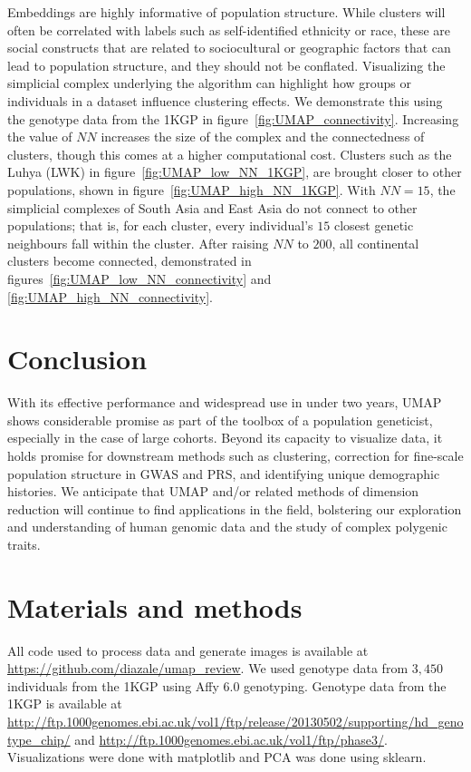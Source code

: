 \documentclass[12pt]{article}
\begin{document}
Embeddings are highly informative of population structure. While clusters will often be correlated with labels such as self-identified ethnicity or race, these are social constructs that are related to sociocultural or geographic factors that can lead to population structure, and they should not be conflated. Visualizing the simplicial complex underlying the algorithm can highlight how groups or individuals in a dataset influence clustering effects. We demonstrate this using the genotype data from the 1KGP in figure~\ref{fig:UMAP_connectivity}. Increasing the value of $NN$ increases the size of the complex and the connectedness of clusters, though this comes at a higher computational cost. Clusters such as the Luhya (LWK) in figure~\ref{fig:UMAP_low_NN_1KGP}, are brought closer to other populations, shown in figure~\ref{fig:UMAP_high_NN_1KGP}. With $NN=15$, the simplicial complexes of South Asia and East Asia do not connect to other populations; that is, for each cluster, every individual's $15$ closest genetic neighbours fall within the cluster. After raising $NN$ to $200$, all continental clusters become connected, demonstrated in figures~\ref{fig:UMAP_low_NN_connectivity} and \ref{fig:UMAP_high_NN_connectivity}.

\section*{Conclusion}
With its effective performance and widespread use in under two years, UMAP shows considerable promise as part of the toolbox of a population geneticist, especially in the case of large cohorts. Beyond its capacity to visualize data, it holds promise for downstream methods such as clustering, correction for fine-scale population structure in GWAS and PRS, and identifying unique demographic histories. We anticipate that UMAP and/or related methods of dimension reduction will continue to find applications in the field, bolstering our exploration and understanding of human genomic data and the study of complex polygenic traits.

\section*{Materials and methods}
All code used to process data and generate images is available at \url{https://github.com/diazale/umap_review}. We used genotype data from $3,450$ individuals from the 1KGP using Affy 6.0 genotyping\cite{10002015global}. Genotype data from the 1KGP is available at \url{http://ftp.1000genomes.ebi.ac.uk/vol1/ftp/release/20130502/supporting/hd_genotype_chip/} and \url{http://ftp.1000genomes.ebi.ac.uk/vol1/ftp/phase3/}. Visualizations were done with matplotlib\cite{Hunter2007} and PCA was done using sklearn\cite{scikit-learn}.
\end{document}
